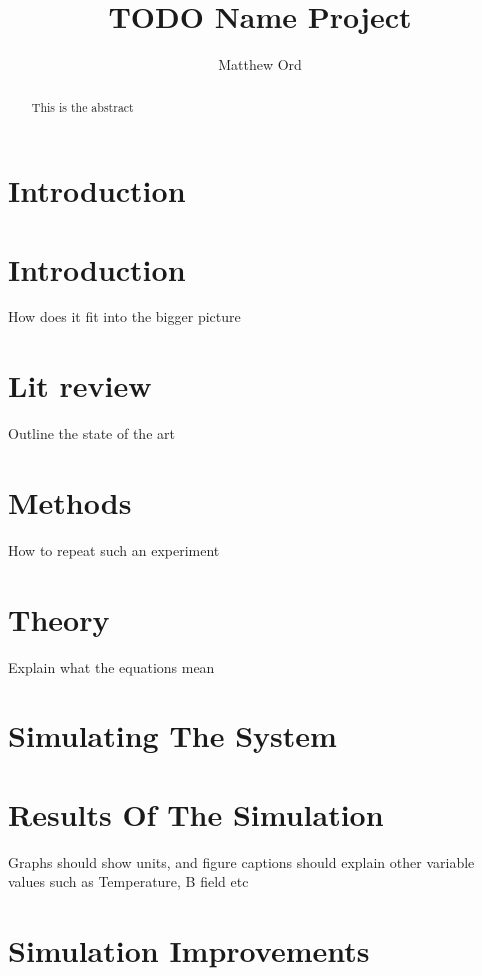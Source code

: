 \documentclass{article}
\title{TODO Name Project}
\author{Matthew Ord}
\date{}
\begin{document}
\maketitle

\begin{abstract}
    This is the abstract
\end{abstract}



\pagebreak
\section{Introduction}


\section{Introduction}
How does it fit into the bigger picture

\section{Lit review}
Outline the state of the art

\section{Methods}
How to repeat such an experiment

\section{Theory}
Explain what the equations mean


\section{Simulating The System}


\section{Results Of The Simulation}
Graphs should show units, and figure captions should explain other variable values such as Temperature, B
field etc

\section{Simulation Improvements}

\end{document}

